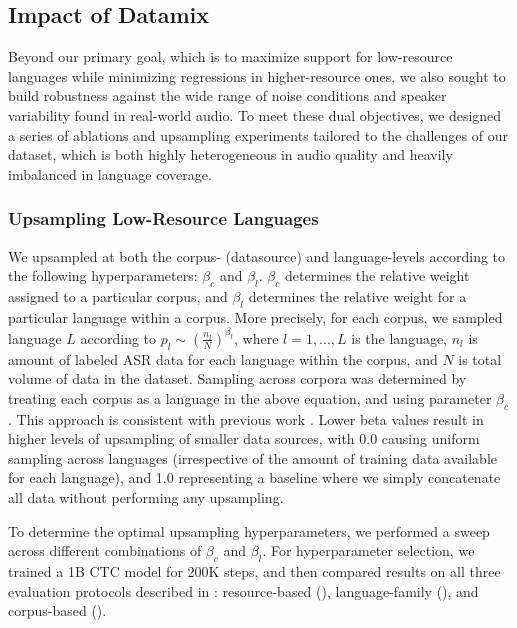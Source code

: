 \subsection{Impact of Datamix}
\label{sec:datamix_ablations}

Beyond our primary goal, which is to maximize support for low-resource languages while minimizing regressions in higher-resource ones, we also sought to build robustness against the wide range of noise conditions and speaker variability found in real-world audio. To meet these dual objectives, we designed a series of ablations and upsampling experiments tailored to the challenges of our \allasr{} dataset, which is both highly heterogeneous in audio quality and heavily imbalanced in language coverage.

\subsubsection{Upsampling Low-Resource Languages}

We upsampled at both the corpus- (datasource) and language-levels according to the following hyperparameters: \(\beta_c\)  and \(\beta_l\). \(\beta_c\) determines the relative weight assigned to a particular corpus, and \(\beta_l\) determines the relative weight for a particular language within a corpus. More precisely, for each corpus, we sampled language $L$ according to $p_l \sim \left( \frac{n_l}{N} \right)^{\beta_l}$, where $l = 1,...,L$ is the language, $n_l$ is amount of labeled ASR data for each language within the corpus, and $N$ is total volume of data in the dataset. Sampling across corpora was determined by treating each corpus as a language in the above equation, and using parameter $\beta_c$. This approach is consistent with previous work \citep{pratap2024scaling}. Lower beta values result in higher levels of upsampling of smaller data sources, with 0.0 causing uniform sampling across languages (irrespective of the amount of training data available for each language), and 1.0 representing a baseline where we simply concatenate all data without performing any upsampling.

To determine the optimal upsampling hyperparameters, we performed a sweep across different combinations of $\beta_c$ and $\beta_l$. For hyperparameter selection, we trained a 1B CTC model for 200K steps, and then compared results on all three evaluation protocols described in : resource-based (), language-family (), and corpus-based ().

